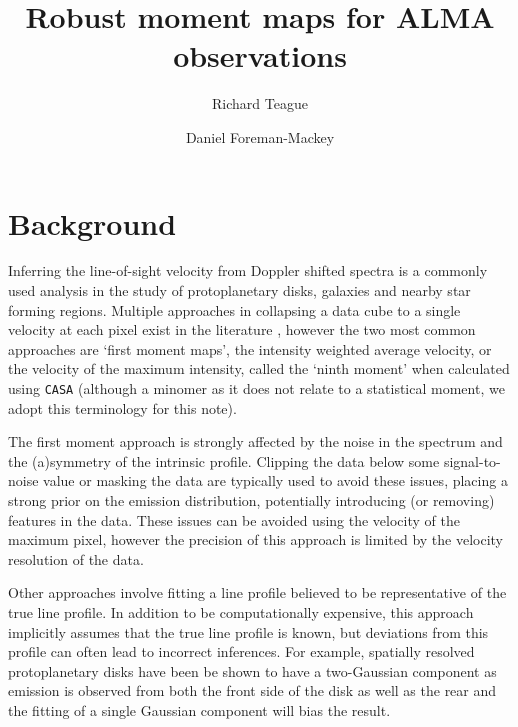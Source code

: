 \documentclass[rnaas]{aastex62}
\begin{document}
\raggedbottom\sloppy\sloppypar\frenchspacing

\title{%
Robust moment maps for ALMA observations
}

\author[0000-0003-1534-5186]{Richard Teague}

\author[0000-0002-9328-5652]{Daniel Foreman-Mackey}


\section{Background}

Inferring the line-of-sight velocity from Doppler shifted spectra is a commonly used analysis in the study of protoplanetary disks, galaxies and nearby star forming regions. Multiple approaches in collapsing a data cube to a single velocity at each pixel exist in the literature \citep[see, for example][]{deBlok:2008}, however the two most common approaches are `first moment maps', the intensity weighted average velocity, or the velocity of the maximum intensity, called the `ninth moment' when calculated using \texttt{CASA} (although a minomer as it does not relate to a statistical moment, we adopt this terminology for this note).

The first moment approach is strongly affected by the noise in the spectrum and the (a)symmetry of the intrinsic profile. Clipping the data below some signal-to-noise value or masking the data are typically used to avoid these issues, placing a strong prior on the emission distribution, potentially introducing (or removing) features in the data. These issues can be avoided using the velocity of the maximum pixel, however the precision of this approach is limited by the velocity resolution of the data.

Other approaches involve fitting a line profile believed to be representative of the true line profile. In addition to be computationally expensive, this approach implicitly assumes that the true line profile is known, but deviations from this profile can often lead to incorrect inferences. For example, spatially resolved protoplanetary disks have been be shown to have a two-Gaussian component as emission is observed from both the front side of the disk as well as the rear \citep{Rosenfeld:2013} and the fitting of a single Gaussian component will bias the result.
\end{document}
